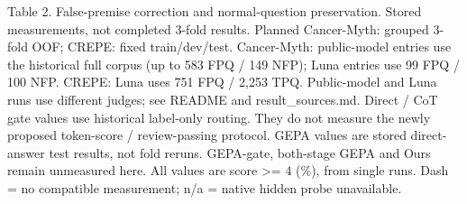 \begin{table}[t]
\caption{Table 2. False-premise correction and normal-question preservation. Stored measurements, not completed 3-fold results. Planned Cancer-Myth: grouped 3-fold OOF; CREPE: fixed train/dev/test. Cancer-Myth: public-model entries use the historical full corpus (up to 583 FPQ / 149 NFP); Luna entries use 99 FPQ / 100 NFP. CREPE: Luna uses 751 FPQ / 2,253 TPQ. Public-model and Luna runs use different judges; see README and result\_sources.md. Direct / CoT gate values use historical label-only routing. They do not measure the newly proposed token-score / review-passing protocol. GEPA values are stored direct-answer test results, not fold reruns. GEPA-gate, both-stage GEPA and Ours remain unmeasured here. All values are score >= 4 (\%), from single runs. Dash = no compatible measurement; n/a = native hidden probe unavailable.}
\label{tab:table2}
\end{table}
